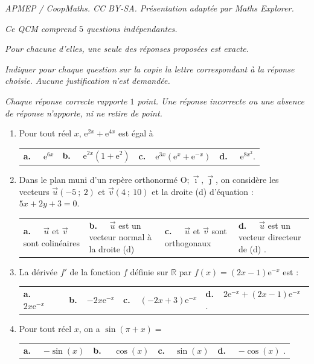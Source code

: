 \documentclass[10pt]{article}
\providecommand{\vv}[1]{\overrightarrow{#1}}
\providecommand{\R}{\mathbb{R}}
\providecommand{\e}{{\mathrm{e}}}
\providecommand{\vv}[1]{{\overrightarrow{#1}}}
\providecommand{\Oij}{\(\mathrm{O};\vec{\imath},\vec{\jmath}\)}
\begin{document}
\noindent\textit{APMEP / CoopMaths. CC BY-SA. Présentation adaptée par Maths Explorer.}\par\medskip
\medskip

\emph{Ce QCM comprend $5$ questions indépendantes.}

\emph{Pour chacune d'elles, une seule des réponses proposées est exacte.}
 
\emph{Indiquer pour chaque question sur la copie la lettre correspondant à la réponse
choisie. Aucune justification n'est demandée.}

\emph{Chaque réponse correcte rapporte $1$ point. Une réponse incorrecte ou une absence de
réponse n'apporte, ni ne retire de point.}

\medskip

\begin{enumerate}
\item Pour tout réel $x$, $\e^{2x}+\e^{4x}$ est égal à

\begin{tabularx}{\linewidth}{*{4}{X}}
\textbf{a.~~} $\e^{6x}$ &\textbf{b.~~} $\e^{2x}(1+\e^{2})$&\textbf{c.~~}$\e^{3x}(\e^{x}+\e^{-x})$& \textbf{d.~~} $\e^{8x^2} $.
\end{tabularx}

\item Dans le plan muni d'un repère orthonormé \Oij, on considère les vecteurs $\vv{u}(-5~;~2)$ et \mbox {$\vv{v}(4~;~10)$} et la droite (d) d'équation : $5x + 2y + 3 = 0$.

\begin{tabularx}{\linewidth}{*{4}{X}}
\textbf{a.~~} $\vv{u}$ et $\vv{v}$  sont colinéaires &\textbf{b.~~} $\vv{u}$ est un vecteur normal à la droite (d) &\textbf{c.~~} $\vv{u}$ et $\vv{v}$  sont orthogonaux& \textbf{d.~~} $\vv{u}$ est un vecteur directeur de (d) .
\end{tabularx}

\item La dérivée $f'$ de la fonction $f$ définie sur $\R$ par $f(x)=(2x-1)\e^{-x}$  est : 

\begin{tabularx}{\linewidth}{*{4}{X}}
\textbf{a.~~}  $2x\e^{-x}$ &\textbf{b.~~}$-2x\e^{-x}$ &\textbf{c.~~}$(-2x+3)\e^{-x}$& \textbf{d.~~}$2\e^{-x}+(2x-1) \e^{-x}$  .
\end{tabularx}

\item Pour tout réel $x$, on a $\sin(\pi+x)=$

\begin{tabularx}{\linewidth}{*{4}{X}}
\textbf{a.~~} $-\sin (x)$ &\textbf{b.~~} $\cos (x)$&\textbf{c.~~}$\sin (x)$& \textbf{d.~~} $-\cos (x)$ .
\end{tabularx}
\smallskip


\end{enumerate}
\end{document}
